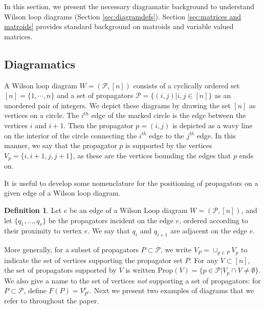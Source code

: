 \documentclass[11pt]{article}
\newcommand{\cP}{\mathcal{P}}
\newcommand{\Prop}{\textrm{Prop}}
\theoremstyle{remark}
\theoremstyle{definition}
\newtheorem{dfn}[thm]{Definition}
\begin{document}
In this section, we present the necessary diagramatic background to understand Wilson loop diagrams (Section \ref{sec:diagramdefs}). Section \ref{sec:matrices and matroids} provides standard background on matroids and variable valued matrices.

\subsection{Diagramatics \label{sec:diagramdefs}}
A Wilson loop diagram $W = (\cP, [n])$ consists of a cyclically ordered set $[n] = \{1, \cdots, n\}$ and a set of propagators $\cP = \{(i,j) | i, j \in [n]\}$ as an unordered pair of integers. We depict these diagrams by drawing the set $[n]$ as vertices on a circle. The $i^{th}$ edge of the marked circle is the edge between the vertices $i$ and $i+1$. Then the propagator $p =(i,j)$ is depicted as a wavy line on the interior of the circle connecting the $i^{th}$ edge to the $j^{th}$ edge. In this manner, we say that the propagator $p$ is supported by the vertices $V_p = \{i, i+1, j, j+1\}$, as these are the vertices bounding the edges that $p$ ends on. 

It is useful to develop some nomenclature for the positioning of propagators on a given edge of a Wilson loop diagram.
  
\begin{dfn}\label{dfn:adjacentprops} Let $e$ be an edge of a Wilson Loop diagram $W = (\cP, [n])$, and  let $\{q_1, \ldots, q_s \}$ be the propagators incident on the edge $e$, ordered according to their proximity to vertex $e$. We say that $q_i$ and $q_{i+1}$ are adjacent on the edge $e$. \end{dfn}

More generally, for a subset of propagators $P \subset \cP$, we write $V_P = \cup_{p \in P} V_p$ to indicate the set of vertices supporting the propagator set $P$. For any $V \subset [n]$, the set of propagators supported by $V$ is written $\Prop(V) = \{ p \in \cP | V_p \cap V \neq \emptyset\}$.  We also give a name to the set of vertices \emph{not} supporting a set of propagators: for $P \subset \cP$, define $F(P) = V_{P^c}^c$. Next we present two examples of diagrams that we refer to throughout the paper.
\end{document}
